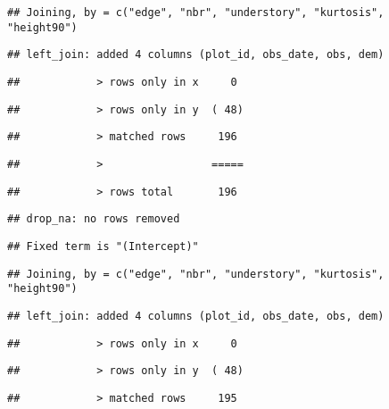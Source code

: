 \documentclass[
]{article}
\begin{document}
\begin{verbatim}
## Joining, by = c("edge", "nbr", "understory", "kurtosis", "height90")
\end{verbatim}

\begin{verbatim}
## left_join: added 4 columns (plot_id, obs_date, obs, dem)
\end{verbatim}

\begin{verbatim}
##            > rows only in x     0
\end{verbatim}

\begin{verbatim}
##            > rows only in y  ( 48)
\end{verbatim}

\begin{verbatim}
##            > matched rows     196
\end{verbatim}

\begin{verbatim}
##            >                 =====
\end{verbatim}

\begin{verbatim}
##            > rows total       196
\end{verbatim}

\begin{verbatim}
## drop_na: no rows removed
\end{verbatim}

\begin{verbatim}
## Fixed term is "(Intercept)"
\end{verbatim}

\begin{verbatim}
## Joining, by = c("edge", "nbr", "understory", "kurtosis", "height90")
\end{verbatim}

\begin{verbatim}
## left_join: added 4 columns (plot_id, obs_date, obs, dem)
\end{verbatim}

\begin{verbatim}
##            > rows only in x     0
\end{verbatim}

\begin{verbatim}
##            > rows only in y  ( 48)
\end{verbatim}

\begin{verbatim}
##            > matched rows     195
\end{verbatim}
\end{document}

